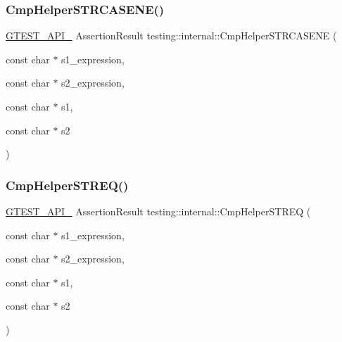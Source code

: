 \mbox{\label{namespacetesting_1_1internal_a5f74b933606b0a742cd5a8ad2d7087e0}} 
\subsubsection{\texorpdfstring{Cmp\+Helper\+S\+T\+R\+C\+A\+S\+E\+N\+E()}{CmpHelperSTRCASENE()}}
{\footnotesize\ttfamily \hyperlink{gtest-port_8h_aa73be6f0ba4a7456180a94904ce17790}{G\+T\+E\+S\+T\+\_\+\+A\+P\+I\+\_\+} Assertion\+Result testing\+::internal\+::\+Cmp\+Helper\+S\+T\+R\+C\+A\+S\+E\+NE (\begin{DoxyParamCaption}\item[{const char $\ast$}]{s1\+\_\+expression,  }\item[{const char $\ast$}]{s2\+\_\+expression,  }\item[{const char $\ast$}]{s1,  }\item[{const char $\ast$}]{s2 }\end{DoxyParamCaption})}

\mbox{\label{namespacetesting_1_1internal_a93eb9d61cac7faf1faff6301ae5f4a46}} 
\subsubsection{\texorpdfstring{Cmp\+Helper\+S\+T\+R\+E\+Q()}{CmpHelperSTREQ()}\hspace{0.1cm}{\footnotesize\ttfamily [1/2]}}
{\footnotesize\ttfamily \hyperlink{gtest-port_8h_aa73be6f0ba4a7456180a94904ce17790}{G\+T\+E\+S\+T\+\_\+\+A\+P\+I\+\_\+} Assertion\+Result testing\+::internal\+::\+Cmp\+Helper\+S\+T\+R\+EQ (\begin{DoxyParamCaption}\item[{const char $\ast$}]{s1\+\_\+expression,  }\item[{const char $\ast$}]{s2\+\_\+expression,  }\item[{const char $\ast$}]{s1,  }\item[{const char $\ast$}]{s2 }\end{DoxyParamCaption})}

